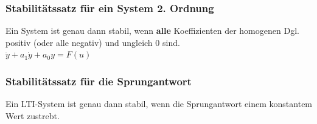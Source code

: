 		\subsubsection{Stabilitätssatz für ein System 2. Ordnung }
			Ein System ist genau dann stabil, wenn {\bf alle} Koeffizienten der
			homogenen Dgl. positiv (oder alle negativ) und ungleich 0 sind.\\
			$\ddot{y}+a_1\dot{y}+a_0y=F(u)$
			
		\subsubsection{Stabilitätssatz für die Sprungantwort}
			Ein LTI-System ist genau dann stabil, wenn die Sprungantwort einem
			konstantem Wert zustrebt.